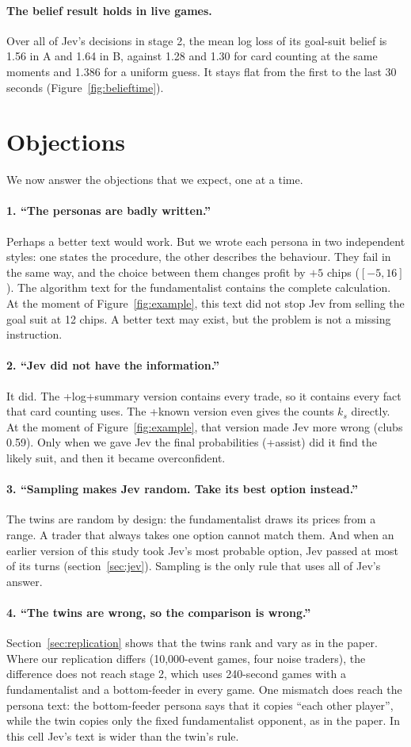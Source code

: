 \documentclass[10pt]{article}
\newcommand{\objection}[1]{\paragraph{#1}}
\begin{document}
\paragraph{The belief result holds in live games.} Over all of Jev's decisions in stage 2, the mean log loss of its
goal-suit belief is 1.56 in A and 1.64 in B, against 1.28 and 1.30 for card counting at the same moments and 1.386
for a uniform guess. It stays flat from the first to the last 30 seconds (Figure~\ref{fig:belieftime}).

\section{Objections}\label{sec:objections}

We now answer the objections that we expect, one at a time.

\objection{1. ``The personas are badly written.''} Perhaps a better text would work. But we wrote each persona in two
independent styles: one states the procedure, the other describes the behaviour. They fail in the same way, and the
choice between them changes profit by $+5$ chips ($[-5, 16]$). The algorithm text for the fundamentalist contains the
complete calculation. At the moment of Figure~\ref{fig:example}, this text did not stop Jev from selling the goal
suit at 12 chips. A better text may exist, but the problem is not a missing instruction.

\objection{2. ``Jev did not have the information.''} It did. The +log+summary version contains every trade, so it contains every
fact that card counting uses. The +known version even gives the counts $k_s$ directly. At the
moment of Figure~\ref{fig:example}, that version made Jev more wrong (clubs 0.59). Only when we gave Jev the final
probabilities (+assist) did it find the likely suit, and then it became overconfident.

\objection{3. ``Sampling makes Jev random. Take its best option instead.''} The twins are random by design: the
fundamentalist draws its prices from a range. A trader that always takes one option cannot match them. And when an
earlier version of this study took Jev's most probable option, Jev passed at most of its turns (section~\ref{sec:jev}). Sampling is the only rule that uses all of Jev's answer.

\objection{4. ``The twins are wrong, so the comparison is wrong.''} Section~\ref{sec:replication} shows that the twins
rank and vary as in the paper. Where our replication differs (10,000-event games, four noise traders), the difference
does not reach stage 2, which uses 240-second games with a fundamentalist and a bottom-feeder in every game. One
mismatch does reach the persona text: the bottom-feeder persona says that it copies ``each other player'', while the
twin copies only the fixed fundamentalist opponent, as in the paper. In this cell Jev's text is wider than the
twin's rule.
\end{document}
